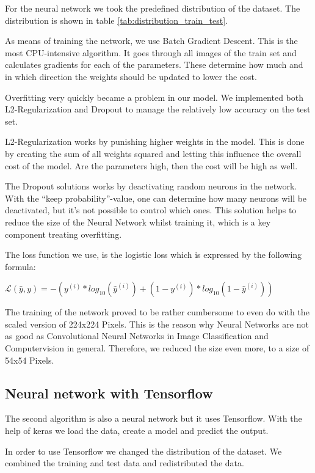 \documentclass{article}
\begin{document}
For the neural network we took the predefined distribution of the dataset. 
The distribution is shown in table \ref{tab:distribution_train_test}.

As means of training the network, we use Batch Gradient Descent. 
This is the most CPU-intensive algorithm. 
It goes through all images of the train set and calculates gradients for each of the parameters. 
These determine how much and in which direction the weights should be updated to lower the cost.

Overfitting very quickly became a problem in our model. 
We implemented both L2-Regularization and Dropout to manage the relatively low accuracy on the test set. 

L2-Regularization works by punishing higher weights in the model. 
This is done by creating the sum of all weights squared and letting this influence the overall cost of the model. 
Are the parameters high, then the cost will be high as well.

The Dropout solutions works by deactivating random neurons in the network. 
With the “keep probability”-value, one can determine how many neurons will be deactivated, 
but it's not possible to control which ones. 
This solution helps to reduce the size of the Neural Network whilst training it, 
which is a key component treating overfitting.

The loss function we use, is the logistic loss which is expressed by the following formula:

$\mathcal{L}(\hat{y},y)=-(y^{(i)}*log_{10}(\hat{y}^{(i)})+(1-y^{(i)})*log_{10}(1-\hat{y}^{(i)}))$

The training of the network proved to be rather cumbersome to even do with the scaled version of 224x224 Pixels. 
This is the reason why Neural Networks are not as good as Convolutional Neural Networks in Image 
Classification and Computervision in general. 
Therefore, we reduced the size even more, to a size of 54x54 Pixels.

\subsection{Neural network with Tensorflow}
\label{sec:neural_network_with_tensorflow}

The second algorithm is also a neural network but it uses Tensorflow. 
With the help of keras we load the data, create a model and predict the output.

In order to use Tensorflow we changed the distribution of the dataset.
We combined the training and test data and redistributed the data.
\end{document}
